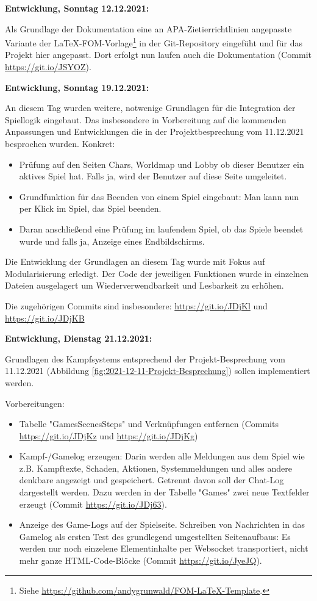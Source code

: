 \textbf{Entwicklung, Sonntag 12.12.2021:}

Als Grundlage der Dokumentation eine an APA-Zietierrichtlinien angepasste Variante der LaTeX-FOM-Vorlage\footnote{Siehe \url{https://github.com/andygrunwald/FOM-LaTeX-Template}.} in der Git-Repository eingefüht und für das Projekt hier angepasst. Dort erfolgt nun laufen auch die Dokumentation (Commit \url{https://git.io/JSYOZ}). 



\textbf{Entwicklung, Sonntag 19.12.2021:}

An diesem Tag wurden weitere, notwenige Grundlagen für die Integration der Spiellogik eingebaut. Das insbesondere in Vorbereitung auf die kommenden Anpassungen und Entwicklungen die in der Projektbesprechung vom 11.12.2021 besprochen wurden. 
Konkret: 

\begin{itemize}
	\item Prüfung auf den Seiten Chars, Worldmap und Lobby ob dieser Benutzer ein aktives Spiel hat. Falls ja, wird der Benutzer auf diese Seite umgeleitet.
	\item Grundfunktion für das Beenden von einem Spiel eingebaut: Man kann nun per Klick im Spiel, das Spiel beenden.
	\item Daran anschließend eine Prüfung im laufendem Spiel, ob das Spiele beendet wurde und falls ja, Anzeige eines Endbildschirms.
\end{itemize}

Die Entwicklung der Grundlagen an diesem Tag wurde mit Fokus auf Modularisierung erledigt. Der Code der jeweiligen Funktionen wurde in einzelnen Dateien ausgelagert um Wiederverwendbarkeit und Lesbarkeit zu erhöhen. 

Die zugehörigen Commits sind insbesondere: 
\url{https://git.io/JDjKl} und 
\url{https://git.io/JDjKB}


\textbf{Entwicklung, Dienstag 21.12.2021:}

Grundlagen des Kampfsystems entsprechend der Projekt-Besprechung vom 11.12.2021 (Abbildung \ref{fig:2021-12-11-Projekt-Besprechung}) sollen implementiert werden.

Vorbereitungen: 

\begin{itemize}
    \item Tabelle "GamesScenesSteps" und Verknüpfungen entfernen (Commits \url{https://git.io/JDjKz} und \url{https://git.io/JDjKg})
    \item Kampf-/Gamelog erzeugen: Darin werden alle Meldungen aus dem Spiel wie z.B. Kampftexte, Schaden, Aktionen, Systemmeldungen und alles andere denkbare angezeigt und gespeichert. Getrennt davon soll der Chat-Log dargestellt werden. Dazu werden in der Tabelle "Games" zwei neue Textfelder erzeugt (Commit \url{https://git.io/JDj63}). 
    \item Anzeige des Game-Logs auf der Spielseite. Schreiben von Nachrichten in das Gamelog als ersten Test des grundlegend umgestellten Seitenaufbaus: Es werden nur noch einzelene Elementinhalte per Websocket transportiert, nicht mehr ganze HTML-Code-Blöcke (Commit \url{https://git.io/JyeJQ}).
\end{itemize}



